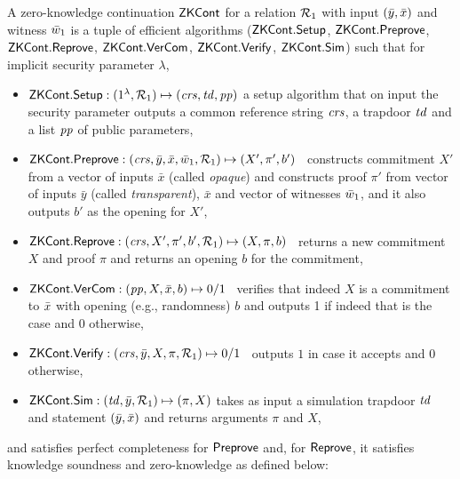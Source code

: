 \begin{definition}[ZK Continuations]
\label{def:zk_cont}
 A zero-knowledge continuation ${\mathsf{ZKCont}}$ for a relation $\mathcal{R}_1$ with 
input $(\bar{y}, \bar{x})$ and witness $\bar{w}_1$ is a tuple of efficient algorithms 
(${\mathsf{ZKCont}}.{\mathsf{Setup}}$, ${\mathsf{ZKCont}}.{\mathsf{Preprove}}$, ${\mathsf{ZKCont}}.{\mathsf{Reprove}}$, ${\mathsf{ZKCont}}.{\mathsf{VerCom}}$, ${\mathsf{ZKCont}}.{\mathsf{Verify}}$, ${\mathsf{ZKCont}}.{\mathsf{Sim}}$) 
such that for implicit security parameter $\lambda$,
\begin{itemize}

\item ${\mathsf{ZKCont}}.{\mathsf{Setup}}: (1^{\lambda}, \mathcal{R}_1) \mapsto (\mathit{crs}, \mathit{td}, \mathit{pp})$ a setup algorithm that on input the security parameter 
outputs a common reference string $\mathit{crs}$, a trapdoor $\mathit{td}$ and a list $\mathit{pp}$ of public parameters, 


\item ${\mathsf{ZKCont}}.{\mathsf{Preprove}}: (\mathit{crs}, \bar{y}, \bar{x}, \bar{w}_1, \mathcal{R}_1) \mapsto (X', \pi', b')$ \,
constructs commitment $X'$ from a vector of inputs $\bar{x}$ (called \emph{opaque}) and 
constructs proof $\pi'$ from vector of inputs 
$\bar{y}$ (called \emph{transparent}), $\bar{x}$ and vector of witnesses $\bar{w}_1$, and it 
also outputs $b'$ as the opening for $X'$,

\item ${\mathsf{ZKCont}}.{\mathsf{Reprove}}: (\mathit{crs}, X', \pi', b', \mathcal{R}_1) \mapsto (X, \pi, b)$ \,
returns a new commitment $X$ and proof $\pi$ and returns an opening $b$ for the commitment, 

\item ${\mathsf{ZKCont}}.{\mathsf{VerCom}}: (\mathit{pp}, X, \bar{x}, b) \mapsto 0/1$ \, 
verifies that indeed $X$ is a commitment to $\bar{x}$ with opening (e.g., randomness) $b$ and 
outputs 1 if indeed that is the case and 0 otherwise,
 
\item ${\mathsf{ZKCont}}.{\mathsf{Verify}}: (\mathit{crs}, \bar{y}, X, \pi, \mathcal{R}_1) \mapsto 0/1$ \, outputs $1$ in case it accepts  and $0$ otherwise,

\item ${\mathsf{ZKCont}}.{\mathsf{Sim}}: (\mathit{td}, \bar{y}, \mathcal{R}_1) \mapsto (\pi, X)$ takes as input a simulation trapdoor $\mathit{td}$ and statement $(\bar{y}, \bar{x})$ and returns 
arguments $\pi$ and $X$,
\end{itemize}
and satisfies perfect completeness for ${\mathsf{Preprove}}$ and, for ${\mathsf{Reprove}}$, it satisfies knowledge soundness and zero-knowledge as defined below:\\


\end{definition}
